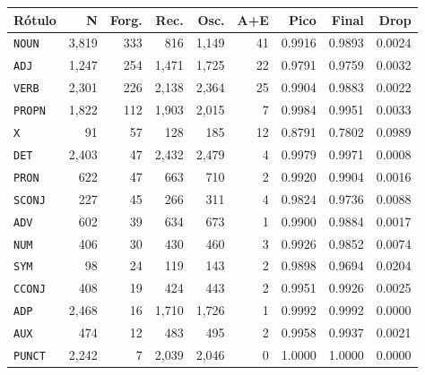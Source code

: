 \begin{table}[ht]
\begin{minipage}[t]{0.54\linewidth}
\end{minipage}
\hfill
\begin{minipage}[t]{0.42\linewidth}
\centering\tiny
\begin{tabular}{lrrrrrrrr}
\toprule
\textbf{Rótulo} & \textbf{N} & \textbf{Forg.} & \textbf{Rec.} & \textbf{Osc.} & \textbf{A+E} & \textbf{Pico} & \textbf{Final} & \textbf{Drop} \\
\midrule
\texttt{NOUN} & 3,819 & 333 & 816 & 1,149 & 41 & 0.9916 & 0.9893 & 0.0024 \\
\texttt{ADJ} & 1,247 & 254 & 1,471 & 1,725 & 22 & 0.9791 & 0.9759 & 0.0032 \\
\texttt{VERB} & 2,301 & 226 & 2,138 & 2,364 & 25 & 0.9904 & 0.9883 & 0.0022 \\
\texttt{PROPN} & 1,822 & 112 & 1,903 & 2,015 & 7 & 0.9984 & 0.9951 & 0.0033 \\
\texttt{X} & 91 & 57 & 128 & 185 & 12 & 0.8791 & 0.7802 & 0.0989 \\
\texttt{DET} & 2,403 & 47 & 2,432 & 2,479 & 4 & 0.9979 & 0.9971 & 0.0008 \\
\texttt{PRON} & 622 & 47 & 663 & 710 & 2 & 0.9920 & 0.9904 & 0.0016 \\
\texttt{SCONJ} & 227 & 45 & 266 & 311 & 4 & 0.9824 & 0.9736 & 0.0088 \\
\texttt{ADV} & 602 & 39 & 634 & 673 & 1 & 0.9900 & 0.9884 & 0.0017 \\
\texttt{NUM} & 406 & 30 & 430 & 460 & 3 & 0.9926 & 0.9852 & 0.0074 \\
\texttt{SYM} & 98 & 24 & 119 & 143 & 2 & 0.9898 & 0.9694 & 0.0204 \\
\texttt{CCONJ} & 408 & 19 & 424 & 443 & 2 & 0.9951 & 0.9926 & 0.0025 \\
\texttt{ADP} & 2,468 & 16 & 1,710 & 1,726 & 1 & 0.9992 & 0.9992 & 0.0000 \\
\texttt{AUX} & 474 & 12 & 483 & 495 & 2 & 0.9958 & 0.9937 & 0.0021 \\
\texttt{PUNCT} & 2,242 & 7 & 2,039 & 2,046 & 0 & 1.0000 & 1.0000 & 0.0000 \\
\bottomrule
\end{tabular}
\end{minipage}
\end{table}


